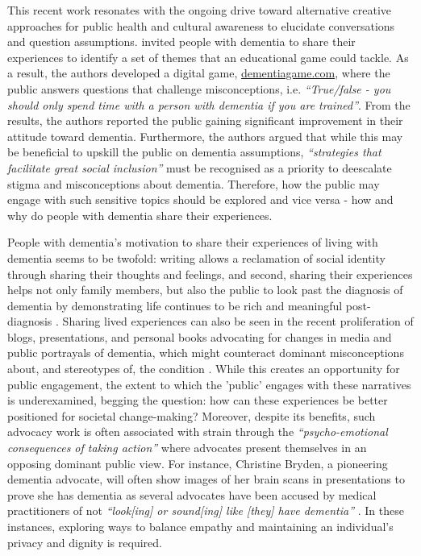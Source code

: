 This recent work resonates with the ongoing drive toward alternative creative approaches for public health and cultural awareness to elucidate conversations and question assumptions. \cite{carter2021effectiveness} invited people with dementia to share their experiences to identify a set of themes that an educational game could tackle. As a result, the authors developed a digital game, \href{https://www.dementiagame.com}{dementiagame.com}, where the public answers questions that challenge misconceptions, i.e. \textit{``True/false - you should only spend time with a person with dementia if you are trained''}. From the results, the authors reported the public gaining significant improvement in their attitude toward dementia. Furthermore, the authors argued that while this may be beneficial to upskill the public on dementia assumptions, \textit{``strategies that facilitate great social inclusion''} must be recognised as a priority to deescalate stigma and misconceptions about dementia. Therefore, how the public may engage with such sensitive topics should be explored and vice versa - how and why do people with dementia share their experiences.

People with dementia's motivation to share their experiences of living with dementia seems to be twofold: writing allows a reclamation of social identity through sharing their thoughts and feelings, and second, sharing their experiences helps not only family members, but also the public to look past the diagnosis of dementia by demonstrating life continues to be rich and meaningful post-diagnosis \citep{ryan_dementia_2009}. Sharing lived experiences can also be seen in the recent proliferation of blogs, presentations, and personal books advocating for changes in media and public portrayals of dementia, which might counteract dominant misconceptions about, and stereotypes of, the condition \citep{christine_bryden_dancing_2005,bryden_challenging_2020}. While this creates an opportunity for public engagement, the extent to which the 'public' engages with these narratives is underexamined, begging the question: how can these experiences be better positioned for societal change-making? Moreover, despite its benefits, such advocacy work is often associated with strain through the \textit{``psycho-emotional consequences of taking action'' }\citep{bartlett_citizenship_2014} where advocates present themselves in an opposing dominant public view. For instance, Christine Bryden, a pioneering dementia advocate, will often show images of her brain scans in presentations to prove she has dementia as several advocates have been accused by medical practitioners of not \textit{``look[ing] or sound[ing] like [they] have dementia''} \citep{swaffer_but_2016}. In these instances, exploring ways to balance empathy and maintaining an individual's privacy and dignity is required.

